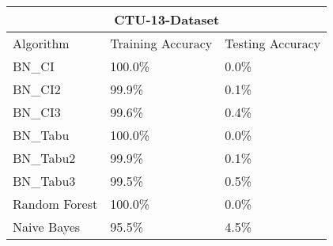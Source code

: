 \documentclass[letterpaper]{article}
\begin{document}
\begin{tabular}{ |p{2.3cm}|p{1.9cm}|p{1.9cm}|  }
\hline
\multicolumn{3}{|c|}{CTU-13-Dataset} \\
\hline
Algorithm & Training Accuracy & Testing Accuracy \\
\hline
BN\_CI & 100.0\% & 0.0\% \\
BN\_CI2 & 99.9\% & 0.1\% \\
BN\_CI3 & 99.6\% & 0.4\% \\
BN\_Tabu & 100.0\% & 0.0\% \\
BN\_Tabu2 & 99.9\% & 0.1\% \\
BN\_Tabu3 & 99.5\% & 0.5\% \\
Random Forest & 100.0\% & 0.0\% \\
Naive Bayes & 95.5\% & 4.5\% \\
\hline
\end{tabular}



\end{document}
